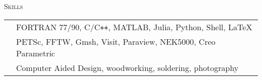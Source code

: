 \documentclass[10pt]{article}
\begin{document}
\vspace{-1.5em}
\begin{multicols}{2}
\textsc{Skills}
\columnbreak

\begin {table}[H]
\begin{tabular}{l l }
\hspace{-0.6em}{Programming  } & \hspace{-0.0em} FORTRAN 77/90, C/C\texttt{++}, MATLAB, Julia, Python, Shell, \LaTeX{}\\
\hspace{-0.6em}{Software     } & \hspace{-0.0em} PETSc, FFTW, Gmsh, Visit, Paraview, NEK5000, Creo Parametric\\
\hspace{-0.6em}{Design} & \hspace{-0.0em} Computer Aided Design, woodworking, soldering, photography \\
\end{tabular}	
\end{table}

\end{multicols}
\vspace{-1.5em}
\end{document}
